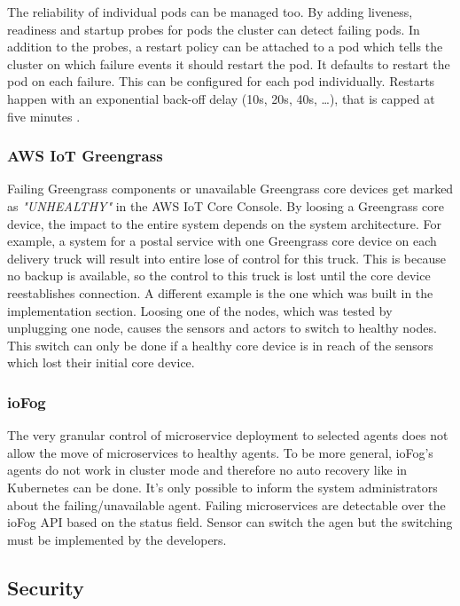 \bigskip
The reliability of individual pods can be managed too. By adding liveness, readiness and startup probes for pods the cluster can detect failing pods.
In addition to the probes, a restart policy can be attached to a pod which tells the cluster on which failure events it should restart the pod. It defaults to restart the pod on each failure. This can be configured for each pod individually. Restarts happen with an exponential back-off delay (10s, 20s, 40s, …), that is capped at five minutes \cite{KubernetesPodLifecycle}.

\subsubsection*{AWS IoT Greengrass}
Failing Greengrass components or unavailable Greengrass core devices get marked as \textit{"UNHEALTHY"} in the AWS IoT Core Console. By loosing a Greengrass core device, the impact to the entire system depends on the system architecture. For example, a system for a postal service with one Greengrass core device on each delivery truck will result into entire lose of control for this truck. This is because no backup is available, so the control to this truck is lost until the core device reestablishes connection. A different example is the one which was built in the implementation section. Loosing one of the nodes, which was tested by unplugging one node, causes the sensors and actors to switch to healthy nodes. This switch can only be done if a healthy core device is in reach of the sensors which lost their initial core device.

\subsubsection*{ioFog}
The very granular control of microservice deployment to selected agents does not allow the move of microservices to healthy agents. To be more general, ioFog's agents do not work in cluster mode and therefore no auto recovery like in Kubernetes can be done. It's only possible to inform the system administrators about the failing/unavailable agent. Failing microservices are detectable over the ioFog API based on the status field. Sensor can switch the agen but the switching must be implemented by the developers.
\subsection*{Security}
